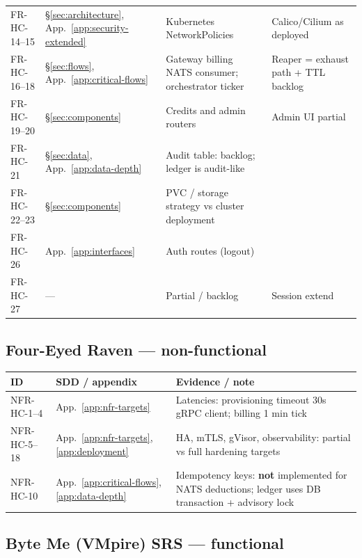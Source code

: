 \documentclass[12pt,a4paper]{article}
\newcommand{\ByteMeHeading}{Byte Me}
\newcommand{\ByteMe}{%
  \texorpdfstring{\textbf{\ByteMeHeading}}{Byte Me}%
}
\begin{document}
{\begin{longtable}{@{}p{2.4cm} p{2.8cm} p{4.2cm} p{4.8cm}@{}}
  FR-HC-14--15 & \S\ref{sec:architecture}, App.~\ref{app:security-extended} & Kubernetes NetworkPolicies & Calico/Cilium as deployed \\
  FR-HC-16--18 & \S\ref{sec:flows}, App.~\ref{app:critical-flows} & Gateway billing NATS consumer; orchestrator ticker & Reaper = exhaust path + TTL backlog \\
  FR-HC-19--20 & \S\ref{sec:components} & Credits and admin routers & Admin UI partial \\
  FR-HC-21 & \S\ref{sec:data}, App.~\ref{app:data-depth} & Audit table: backlog; ledger is audit-like & \\
  FR-HC-22--23 & \S\ref{sec:components} & PVC / storage strategy vs cluster deployment & \\
  FR-HC-26 & App.~\ref{app:interfaces} & Auth routes (logout) & \\
  FR-HC-27 & --- & Partial / backlog & Session extend \\
\end{longtable}
}

\subsection{Four-Eyed Raven --- non-functional}
\begin{tabularx}{\textwidth}{@{}p{2.5cm} p{3cm} X@{}}
  \toprule
  \textbf{ID} & \textbf{SDD / appendix} & \textbf{Evidence / note} \\
  \midrule
  NFR-HC-1--4 & App.~\ref{app:nfr-targets} & Latencies: provisioning timeout 30s gRPC client; billing 1 min tick \\
  NFR-HC-5--18 & App.~\ref{app:nfr-targets}, \ref{app:deployment} & HA, mTLS, gVisor, observability: partial vs full hardening targets \\
  NFR-HC-10 & App.~\ref{app:critical-flows}, \ref{app:data-depth} & Idempotency keys: \textbf{not} implemented for NATS deductions; ledger uses DB transaction + advisory lock \\
  \bottomrule
\end{tabularx}

\subsection{\ByteMe{} (VMpire) SRS --- functional}
\end{document}
